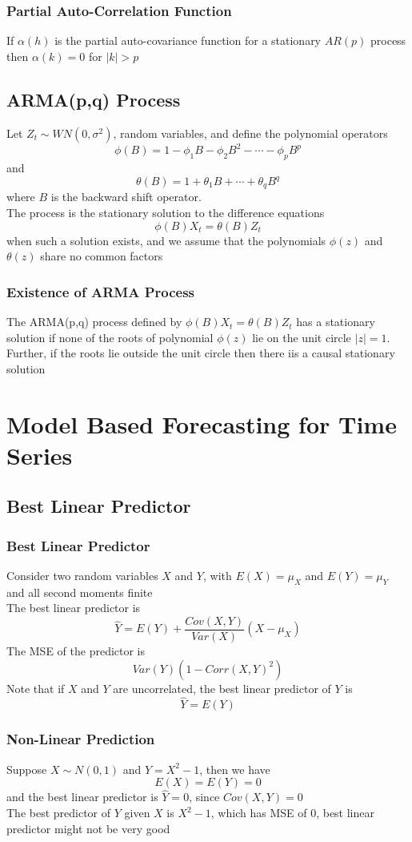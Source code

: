 \documentclass[11pt]{article}
\begin{document}
\subsubsection{Partial Auto-Correlation Function}
If $\alpha(h)$ is the partial auto-covariance function for a stationary $AR(p)$ process then $\alpha(k)=0$ for $|k|>p$
\subsection{ARMA(p,q) Process}
Let $Z_t\sim WN(0,\sigma^2)$, random variables, and define the polynomial operators 
\[\phi(B)=1-\phi_1B-\phi_2B^2-\cdots-\phi_pB^p\]   
and 
\[\theta(B)=1+\theta_1B+\cdots+\theta_qB^q\]   
where $B$ is the backward shift operator. \\
The process is the stationary solution to the difference equations 
\[\phi(B)X_t = \theta(B)Z_t\]    
when such a solution exists, and we assume that the polynomials $\phi(z)$ and $\theta(z)$ share no common factors 
\subsubsection{Existence of ARMA Process}
The ARMA(p,q) process defined by $\phi(B)X_t = \theta(B)Z_t$ has a stationary solution if none of the roots of polynomial $\phi(z)$ lie on the unit circle $|z|=1$. Further, if the roots lie outside the unit circle then there iis a causal stationary solution 

\newpage 
\section{Model Based Forecasting for Time Series}
\subsection{Best Linear Predictor}
\subsubsection{Best Linear Predictor}
Consider two random variables $X$ and $Y$, with $E(X)=\mu_X$ and $E(Y)=\mu_Y$ and all second moments finite \\
The best linear predictor is 
\[\hat{Y} = E(Y) + \frac{Cov(X,Y)}{Var(X)}(X-\mu_X)\]    
The MSE of the predictor is 
\[Var(Y)(1-Corr(X,Y)^2)\]    
Note that if $X$ and $Y$ are uncorrelated, the best linear predictor of $Y$ is 
\[\hat{Y} = E(Y)\]    
\subsubsection{Non-Linear Prediction}
Suppose $X\sim N(0,1)$ and $Y=X^2-1$, then we have 
\[E(X) = E(Y) = 0\]   
and the best linear predictor is $\hat{Y}=0$, since $Cov(X,Y)=0$ \\
The best predictor of $Y$ given $X$ is $X^2-1$, which has MSE of $0$, best linear predictor might not be very good 
\end{document}
